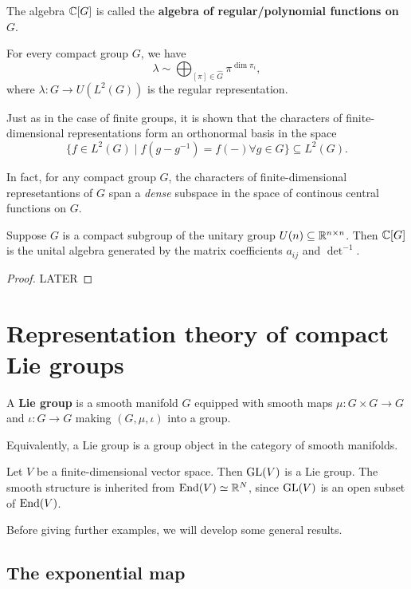 \documentclass[11pt, english]{article}
\begin{document}
The algebra $\mathbb{C}[G]$ is called the \textbf{algebra of regular/polynomial functions on $G$}.

\begin{thm}
  For every compact group $G$, we have 
$$
\lambda \sim \bigoplus_{[\pi] \in \widehat G} \pi^{\dim \pi_i},
$$
where $\lambda:G \to U(L^2(G))$ is the regular representation.
\end{thm}

Just as in the case of finite groups, it is shown that the characters of finite-dimensional representations form an orthonormal basis in the space 
$$
\{ f \in L^2(G) \mid f(g - g^{-1}) = f(-) \forall g \in G \} \subseteq L^2(G).
$$

In fact, for any compact group $G$, the characters of finite-dimensional represetantions of $G$ span a \emph{dense} subspace in the space of continous central functions on $G$. 

\begin{thm}
  Suppose $G$ is a compact subgroup of the unitary group $U(n) \subseteq \mathbb{R}^{n\times n}$. Then $\mathbb{C}[G]$ is the unital algebra generated by the matrix coefficients $a_{ij}$ and $\det^{-1}$. 
\end{thm}

\begin{proof}
  LATER
\end{proof}

\newpage
\section{Representation theory of compact Lie groups}

A \textbf{Lie group} is a smooth manifold $G$ equipped with smooth maps $\mu:G \times G \to G$ and $\iota:G \to G$ making $(G,\mu,\iota)$ into a group.

Equivalently, a Lie group is a group object in the category of smooth manifolds.

\begin{example}
 Let $V$ be a finite-dimensional vector space. Then $\operatorname{GL}(V)$ is a Lie group. The smooth structure is inherited from $\operatorname{End}(V) \simeq \mathbb{R}^N$, since $\operatorname{GL}(V)$ is an open subset of $\operatorname{End}(V)$.
\end{example}

Before giving further examples, we will develop some general results.

\subsection{The exponential map}
\end{document}
